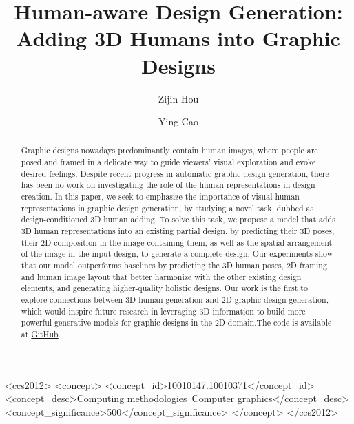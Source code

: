 \documentclass[sigconf]{acmart}
\begin{document}
\title{Human-aware Design Generation: Adding 3D Humans into Graphic Designs}

\author{Zijin Hou}

\author{Ying Cao}

\begin{abstract}
Graphic designs nowadays predominantly contain human images, where people are posed and framed in a delicate way to guide viewers' visual exploration and evoke desired feelings. Despite recent progress in automatic graphic design generation, there has been no work on investigating the role of the human representations in design creation. In this paper, we seek to emphasize the importance of visual human representations in graphic design generation, by studying a novel task, dubbed as design-conditioned 3D human adding. To solve this task, we propose a model that adds 3D human representations into an existing partial design, by predicting their 3D poses, their 2D composition in the image containing them, as well as the spatial arrangement of the image in the input design, to generate a complete design.
Our experiments show that our model outperforms baselines by predicting the 3D human poses, 2D framing and human image layout that better harmonize with the other existing design elements, and generating higher-quality holistic designs. Our work is the first to explore connections between 3D human generation and 2D graphic design generation, which would inspire future research in leveraging 3D information to build more powerful generative models for graphic designs in the 2D domain.The code is available at
\href{https://github.com/GreyNails/Human-aware-Design-Generation-Adding-3D-Humans-into-Graphic-Designs}{GitHub}.
\end{abstract}

\begin{CCSXML}
<ccs2012>
<concept>
<concept_id>10010147.10010371</concept_id>
<concept_desc>Computing methodologies~Computer graphics</concept_desc>
<concept_significance>500</concept_significance>
</concept>
</ccs2012>
\end{CCSXML}

\end{document}
